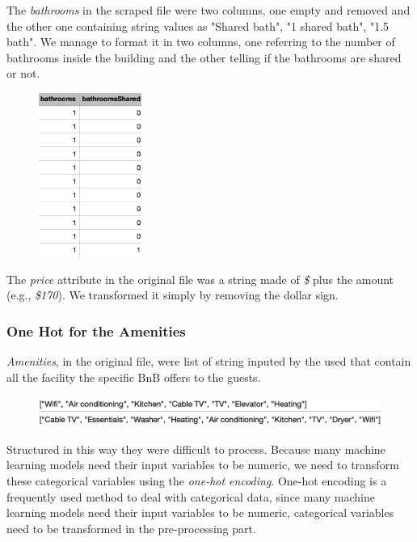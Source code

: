 The \textit{bathrooms} in the scraped file were two columns, one empty and removed and the other one containing string values as "Shared bath", "1 shared bath", "1.5 bath". We manage to format it in two columns, one referring to the number of bathrooms inside the building and the other telling if the bathrooms are shared or not.
\begin{figure}[H]
	\centering
	\includegraphics[width=0.3\textwidth]{img/bath.png}  
\end{figure}

The \textit{price} attribute in the original file was a string made of \textit{\$} plus the amount (e.g., \textit{\$170}). We transformed it simply by removing the dollar sign.

\subsubsection{One Hot for the Amenities}
\textit{Amenities}, in the original file, were list of string inputed by the used that contain all the facility the specific BnB offers to the guests.
\begin{figure}[H]
	\centering
	\includegraphics[width=\textwidth]{img/amenities.png}  
\end{figure}

Structured in this way they were difficult to process. Because many machine learning models need their input variables to be numeric, we need to transform these categorical variables using the \textit{one-hot encoding}. One-hot encoding is a frequently used method to deal with categorical data, since many machine learning models need their input variables to be numeric, categorical variables need to be transformed in the pre-processing part.

